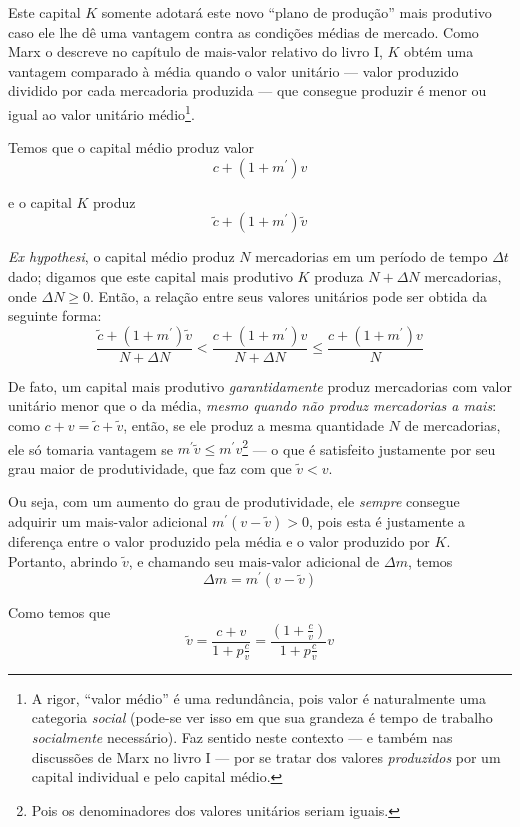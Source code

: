 Este capital $K$ somente adotará este novo ``plano de produção'' mais produtivo caso ele lhe dê uma vantagem contra as condições médias de mercado. Como Marx o descreve no capítulo de mais-valor relativo do livro I, $K$ obtém uma vantagem comparado à média quando o valor unitário — valor produzido dividido por cada mercadoria produzida — que consegue produzir é menor ou igual ao valor unitário médio\footnote{A rigor, ``valor médio'' é uma redundância, pois valor é naturalmente uma categoria \textit{social} (pode-se ver isso em que sua grandeza é tempo de trabalho \textit{socialmente} necessário). Faz sentido neste contexto — e também nas discussões de Marx no livro I — por se tratar dos valores \textit{produzidos} por um capital individual e pelo capital médio.}. 

Temos que o capital médio produz valor
$$
c + (1+m^{\prime})v
$$

e o capital $K$ produz
$$
\tilde{c}+(1+m^{\prime})\tilde{v}
$$

\textit{Ex hypothesi}, o capital médio produz $N$ mercadorias em um período de tempo $\Delta t$ dado; digamos que este capital mais produtivo $K$ produza $N+\Delta N$ mercadorias, onde $\Delta N \geq 0$. Então, a relação entre seus valores unitários pode ser obtida da seguinte forma: 
$$
\frac{\tilde{c} + (1+m^{\prime})\tilde{v}}{N+\Delta N} < \frac{c+(1+m^{\prime})v}{N+\Delta N} \leq \frac{c+(1+m^{\prime})v}{N}
$$

De fato, um capital mais produtivo \textit{garantidamente} produz mercadorias com valor unitário menor que o da média, \textit{mesmo quando não produz mercadorias a mais}: como $c+v = \tilde{c}+\tilde{v}$, então, se ele produz a mesma quantidade $N$ de mercadorias, ele só tomaria vantagem se $m^{\prime}\tilde{v} \leq m^{\prime}v$\footnote{Pois os denominadores dos valores unitários seriam iguais.} — o que é satisfeito justamente por seu grau maior de produtividade, que faz com que $\tilde{v} < v$. 

Ou seja, com um aumento do grau de produtividade, ele \textit{sempre} consegue adquirir um mais-valor adicional $m^{\prime}(v-\tilde{v}) > 0$, pois esta é justamente a diferença entre o valor produzido pela média e o valor produzido por $K$. Portanto, abrindo $\tilde{v}$, e chamando seu mais-valor adicional de $\Delta m$, temos
$$
\Delta m = m^{\prime}(v-\tilde{v})
$$

Como temos que 
$$
\tilde{v} = \frac{c+v}{1+p \frac{c}{v}} = \frac{\left( 1+\frac{c}{v} \right)}{1+p \frac{c}{v}} v
$$


